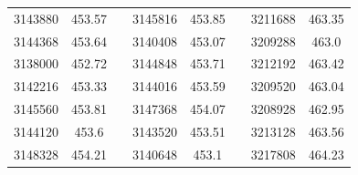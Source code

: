 \documentclass[12pt]{mwart}
\begin{document}
\begin{table}[H]
\begin{tabular}{cclcclcc}
		3143880                                                  & 453.57                                                        &  & 3145816                                                  & 453.85                                                        &  & 3211688                                                  & 463.35                                                        \\
		3144368                                                  & 453.64                                                        &  & 3140408                                                  & 453.07                                                        &  & 3209288                                                  & 463.0                                                         \\
		3138000                                                  & 452.72                                                        &  & 3144848                                                  & 453.71                                                        &  & 3212192                                                  & 463.42                                                        \\
		3142216                                                  & 453.33                                                        &  & 3144016                                                  & 453.59                                                        &  & 3209520                                                  & 463.04                                                        \\
		3145560                                                  & 453.81                                                        &  & 3147368                                                  & 454.07                                                        &  & 3208928                                                  & 462.95                                                        \\
		3144120                                                  & 453.6                                                         &  & 3143520                                                  & 453.51                                                        &  & 3213128                                                  & 463.56                                                        \\
		3148328                                                  & 454.21                                                        &  & 3140648                                                  & 453.1                                                         &  & 3217808                                                  & 464.23                                                        \\

\end{tabular}
\end{table}
\end{document}
